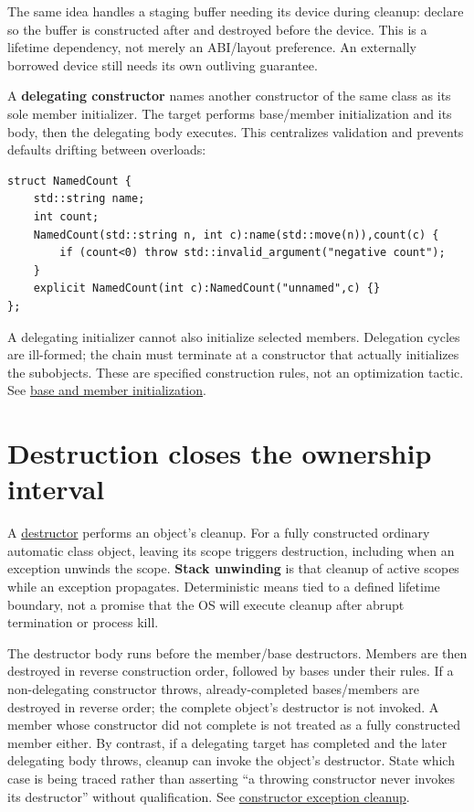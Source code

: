 The same idea handles a staging buffer needing its device during cleanup: declare  so the buffer is constructed after and destroyed before the device. This is a lifetime dependency, not merely an ABI/layout preference. An externally borrowed device still needs its own outliving guarantee.

A \textbf{delegating constructor} names another constructor of the same class as its sole member initializer. The target performs base/member initialization and its body, then the delegating body executes. This centralizes validation and prevents defaults drifting between overloads:

\begin{verbatim}
struct NamedCount {
    std::string name;
    int count;
    NamedCount(std::string n, int c):name(std::move(n)),count(c) {
        if (count<0) throw std::invalid_argument("negative count");
    }
    explicit NamedCount(int c):NamedCount("unnamed",c) {}
};
\end{verbatim}

A delegating initializer cannot also initialize selected members. Delegation cycles are ill-formed; the chain must terminate at a constructor that actually initializes the subobjects. These are specified construction rules, not an optimization tactic. See \href{https://eel.is/c++draft/class.base.init}{base and member initialization}.

\section{Destruction closes the ownership interval}\label{01-foundations-i-ch003-destruction-closes-the-ownership-interval}

\hypertarget{01-foundations-i-ch003-destruction-closes-the-ownership-interval}{}

A \hyperref[appendix-9bfe377cef7a]{destructor} performs an object's cleanup. For a fully constructed ordinary automatic class object, leaving its scope triggers destruction, including when an exception unwinds the scope. \textbf{Stack unwinding} is that cleanup of active scopes while an exception propagates. Deterministic means tied to a defined lifetime boundary, not a promise that the OS will execute cleanup after abrupt termination or process kill.

The destructor body runs before the member/base destructors. Members are then destroyed in reverse construction order, followed by bases under their rules. If a non-delegating constructor throws, already-completed bases/members are destroyed in reverse order; the complete object's destructor is not invoked. A member whose constructor did not complete is not treated as a fully constructed member either. By contrast, if a delegating target has completed and the later delegating body throws, cleanup can invoke the object's destructor. State which case is being traced rather than asserting ``a throwing constructor never invokes its destructor'' without qualification. See \href{https://eel.is/c++draft/except.ctor}{constructor exception cleanup}.

